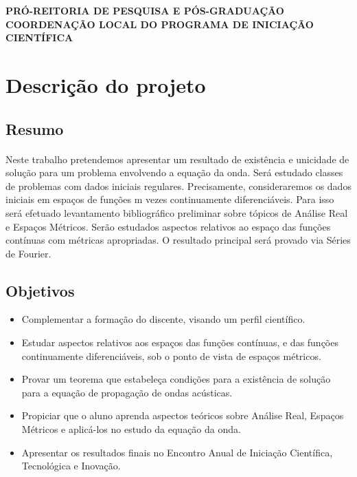 \documentclass[a4paper,12pt]{article}
\begin{document}
\begin{flushleft}
    \textbf{\large PRÓ-REITORIA DE PESQUISA E PÓS-GRADUAÇÃO}
    \linebreak
    \linebreak
    \textbf{\large COORDENAÇÃO LOCAL DO PROGRAMA DE INICIAÇÃO CIENTÍFICA}
\end{flushleft}

\vspace{1cm}

\section{Descrição do projeto}

\subsection{Resumo}
\paragraph*{}


Neste trabalho pretendemos apresentar um resultado de existência e unicidade de
solução para um problema envolvendo a equação da onda. Será estudado classes de
problemas com dados iniciais regulares. Precisamente, consideraremos os dados
iniciais em espaços de funções m vezes continuamente diferenciáveis. Para isso será
efetuado levantamento bibliográfico preliminar sobre tópicos de Análise Real e
Espaços Métricos. Serão estudados aspectos relativos ao espaço das funções
contínuas com métricas apropriadas. O resultado principal será provado via Séries de
Fourier.

\subsection{Objetivos}

\begin{itemize}
    \item Complementar a formação do discente, visando um perfil científico.

    \item Estudar aspectos relativos aos espaços das funções contínuas, e das funções
          continuamente diferenciáveis, sob o ponto de vista de espaços métricos.

    \item Provar um teorema que estabeleça condições para a existência de solução
          para a equação de propagação de ondas acústicas.

    \item Propiciar que o aluno aprenda aspectos teóricos sobre Análise Real, Espaços
          Métricos e aplicá-los no estudo da equação da onda.

    \item Apresentar os resultados finais no Encontro Anual de Iniciação Científica,
          Tecnológica e Inovação.
\end{itemize}
\end{document}
